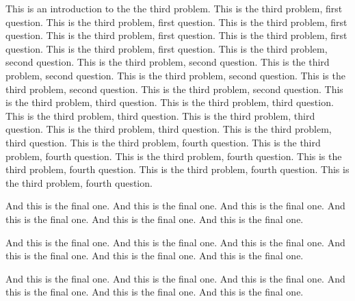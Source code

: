 \documentclass{cisXXX} %
\begin{document}
\HWproblem
This is an introduction to the the third problem.
\HWsubproblem
This is the third problem, first question.
This is the third problem, first question.
This is the third problem, first question.
This is the third problem, first question.
This is the third problem, first question.
This is the third problem, first question.
\HWsubproblem
This is the third problem, second question.
This is the third problem, second question.
This is the third problem, second question.
This is the third problem, second question.
This is the third problem, second question.
This is the third problem, second question.
\HWsubproblem
This is the third problem, third question.
This is the third problem, third question.
This is the third problem, third question.
This is the third problem, third question.
This is the third problem, third question.
This is the third problem, third question.
\HWsubproblem
This is the third problem, fourth question.
This is the third problem, fourth question.
This is the third problem, fourth question.
This is the third problem, fourth question.
This is the third problem, fourth question.
This is the third problem, fourth question.

\HWproblem
And this is the final one.
And this is the final one.
And this is the final one.
And this is the final one.
And this is the final one.
And this is the final one.

And this is the final one.
And this is the final one.
And this is the final one.
And this is the final one.
And this is the final one.
And this is the final one.

And this is the final one.
And this is the final one.
And this is the final one.
And this is the final one.
And this is the final one.
And this is the final one.
\end{document}
